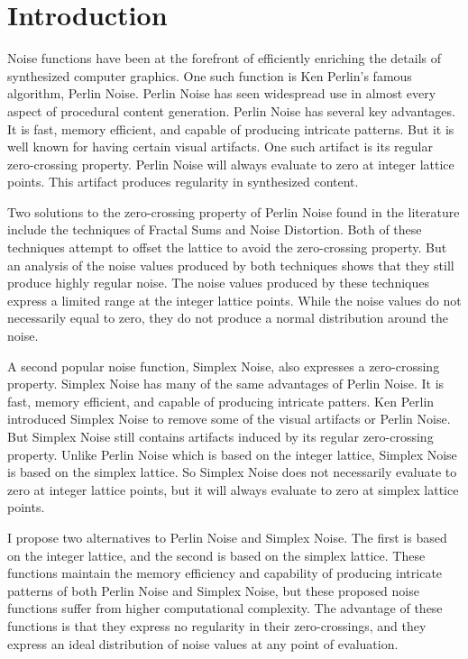 \documentclass[12pt]{article}
\theoremstyle{definition}
\theoremstyle{remark}
\begin{document}
\maketitle

\singlespacing
\section{Introduction}
\doublespacing

Noise functions have been at the forefront of efficiently enriching the details of synthesized computer graphics. One such function is Ken Perlin's famous algorithm, Perlin Noise. Perlin Noise has seen widespread use in almost every aspect of procedural content generation\cite{lagaeetal2010}. Perlin Noise has several key advantages. It is fast, memory efficient, and capable of producing intricate patterns. But it is well known for having certain visual artifacts. One such artifact is its regular zero-crossing property. Perlin Noise will always evaluate to zero at integer lattice points. This artifact produces regularity in synthesized content. 

Two solutions to the zero-crossing property of Perlin Noise found in the literature include the techniques of Fractal Sums and Noise Distortion. Both of these techniques attempt to offset the lattice to avoid the zero-crossing property. But an analysis of the noise values produced by both techniques shows that they still produce highly regular noise. The noise values produced by these techniques express a limited range at the integer lattice points. While the noise values do not necessarily equal to zero, they do not produce a normal distribution around the noise.

A second popular noise function, Simplex Noise, also expresses a zero-crossing property. Simplex Noise has many of the same advantages of Perlin Noise. It is fast, memory efficient, and capable of producing intricate patters. Ken Perlin\cite{perlin2001} introduced Simplex Noise to remove some of the visual artifacts or Perlin Noise. But Simplex Noise still contains artifacts induced by its regular zero-crossing property. Unlike Perlin Noise which is based on the integer lattice, Simplex Noise is based on the simplex lattice. So Simplex Noise does not necessarily evaluate to zero at integer lattice points, but it will always evaluate to zero at simplex lattice points. 

I propose two alternatives to Perlin Noise and Simplex Noise. The first is based on the integer lattice, and the second is based on the simplex lattice. These functions maintain the memory efficiency and capability of producing intricate patterns of both Perlin Noise and Simplex Noise, but these proposed noise functions suffer from higher computational complexity. The advantage of these functions is that they express no regularity in their zero-crossings, and they express an ideal distribution of noise values at any point of evaluation.
\end{document}
